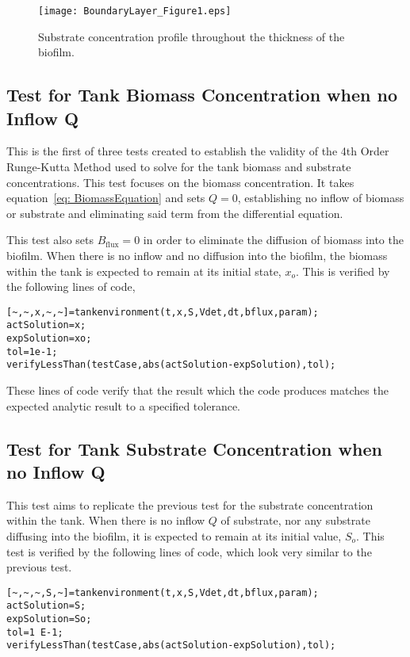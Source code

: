 \documentclass[letterpaper, twoside]{article}
\numberwithin{equation}{section}
\begin{document}
\begin{figure}[H]
  \centering
  \texttt{[image: BoundaryLayer\_Figure1.eps]}
  \caption{Substrate concentration profile throughout the thickness of the biofilm.}
\end{figure}

\subsection{Test for Tank Biomass Concentration when no Inflow Q}
This is the first of three tests created to establish the validity of the 4th Order Runge-Kutta Method used to solve for the tank biomass and substrate concentrations. This test focuses on the biomass concentration. It takes equation~\ref{eq: BiomassEquation} and sets $Q=0$, establishing no inflow of biomass or substrate and eliminating said term from the differential equation. 

This test also sets $B_\mathrm{flux}=0$ in order to eliminate the diffusion of biomass into the biofilm. 
When there is no inflow and no diffusion into the biofilm, the biomass within the tank is expected to remain at its initial state, $x_o$. This is verified by the following lines of code,

\begin{lstlisting}
[~,~,x,~,~]=tankenvironment(t,x,S,Vdet,dt,bflux,param);
actSolution=x;
expSolution=xo;
tol=1e-1;
verifyLessThan(testCase,abs(actSolution-expSolution),tol);
\end{lstlisting}

These lines of code verify that the result which the code produces matches the expected analytic result to a specified tolerance.

\subsection{Test for Tank Substrate Concentration when no Inflow Q}
This test aims to replicate the previous test for the substrate concentration within the tank. When there is no inflow $Q$ of substrate, nor any substrate diffusing into the biofilm, it is expected to remain at its initial value, $S_o$. This test is verified by the following lines of code, which look very similar to the previous test.

\begin{lstlisting}
[~,~,~,S,~]=tankenvironment(t,x,S,Vdet,dt,bflux,param);
actSolution=S; 
expSolution=So;
tol=1 E-1;
verifyLessThan(testCase,abs(actSolution-expSolution),tol); 
\end{lstlisting}
\end{document}
